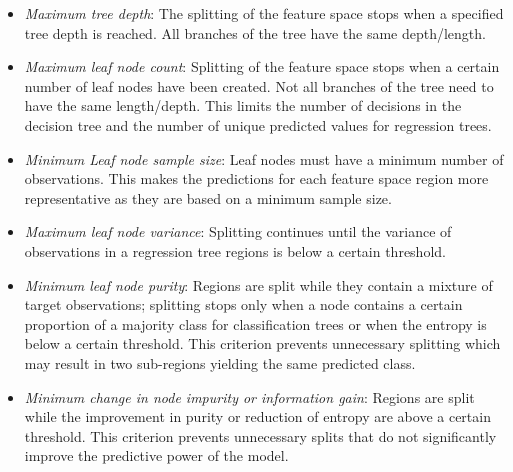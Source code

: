 \begin{itemize}
  \item \emph{Maximum tree depth}: The splitting of the feature space stops when a specified tree depth is reached. All branches of the tree have the same depth/length. 
  \item \emph{Maximum leaf node count}: Splitting of the feature space stops when a certain number of leaf nodes have been created. Not all branches of the tree need to have the same length/depth. This limits the number of decisions in the decision tree and the number of unique predicted values for regression trees.
  \item \emph{Minimum Leaf node sample size}: Leaf nodes must have a minimum number of observations. This makes the predictions for each feature space region more representative as they are based on a minimum sample size.
  \item \emph{Maximum leaf node variance}: Splitting continues until the variance of observations in a regression tree regions is below a certain threshold. 
  \item \emph{Minimum leaf node purity}: Regions are split while they contain a mixture of target observations; splitting stops only when a node contains a certain proportion of a majority class for classification trees or when the entropy is below a certain threshold. This criterion prevents unnecessary splitting which may result in two sub-regions yielding the same predicted class. 
  \item \emph{Minimum change in node impurity or information gain}: Regions are split while the improvement in purity or reduction of entropy are above a certain threshold. This criterion prevents unnecessary splits that do not significantly improve the predictive power of the model. 
\end{itemize}

